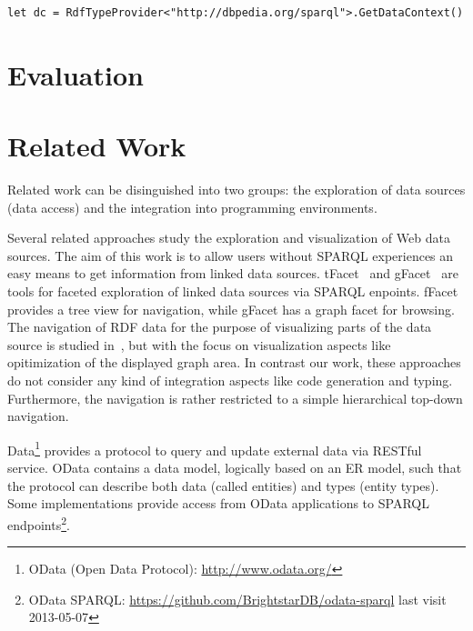 \documentclass{llncs} %
\begin{document}
\begin{lstlisting}[style=code, caption={Initialize data handler}, label={lst:useTP1}]
let dc = RdfTypeProvider<"http://dbpedia.org/sparql">.GetDataContext()
\end{lstlisting}

\section{Evaluation}
\label{sec:eval}


 
\section{Related Work}
\label{sec:rw}

Related work can be disinguished into two groups: the exploration of data sources (data access)
and the integration into programming environments.

Several related approaches study the exploration and visualization of Web data sources. 
The aim of this work is to allow users without SPARQL experiences an easy means to
get information from linked data sources.
tFacet~\cite{tFacet} and gFacet~\cite{heim2008gfacet} are tools for faceted exploration of linked data sources
via SPARQL enpoints. fFacet provides a tree view for navigation, while gFacet has a graph facet for browsing.
The navigation of RDF data for the purpose of visualizing parts of the data source is studied in~\cite{DBLP:conf/iv/DokulilK08},
but with the focus on visualization aspects like opitimization of the displayed graph area.
In contrast our work, these approaches do not consider any kind of integration aspects like code generation and typing.
Furthermore, the navigation is rather restricted to a simple hierarchical top-down navigation.

Data\footnote{OData (Open Data Protocol): \url{http://www.odata.org/}}  provides a protocol to query and update external data via RESTful service.
OData contains a data model, logically based on an ER model, such that the protocol can describe both data (called entities) and types (entity types).
Some implementations provide access from OData applications to SPARQL endpoints\footnote{OData SPARQL: \url{https://github.com/BrightstarDB/odata-sparql} last visit 2013-05-07}.
\end{document}

